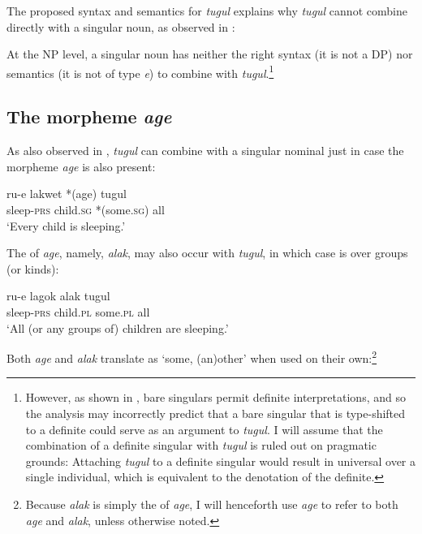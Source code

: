 \documentclass[output=paper]{LSP/langsci}
\begin{document}
The proposed syntax and semantics for \textit{tugul} explains why \textit{tugul} cannot combine directly with a singular noun, as observed in :

\z

\noindent At the NP level, a singular noun has neither the right syntax (it is not a DP) nor semantics (it is not of type \textit{e}) to combine with \textit{tugul}.\footnote{However, as shown in , bare singulars permit definite interpretations, and so the analysis may incorrectly predict that a bare singular that is type-shifted to a definite could serve as an argument to \textit{tugul}. I will assume that the combination of a definite singular with \textit{tugul} is ruled out on pragmatic grounds: Attaching \textit{tugul} to a definite singular would result in universal  over a single individual, which is equivalent to the denotation of the definite.}   

\subsection{The morpheme \textit{age}}
As also observed in , \textit{tugul} can combine with a singular nominal just in case the morpheme \textit{age} is also present:

\ea \label{ex:landman:agetugul}
\gll ru-e lakwet *(age) tugul\\
       sleep-\textsc{prs} child.\textsc{sg} *(some.\textsc{sg}) all\\
  \glt ‘Every child is sleeping.’
\z

\noindent The  of \textit{age}, namely, \textit{alak}, may also occur with \textit{tugul}, in which case  is over groups (or kinds):

\ea \label{ex:landman:alaktugul}
\gll ru-e lagok alak tugul\\
       sleep-\textsc{prs} child.\textsc{pl} some.\textsc{pl} all\\
  \glt ‘All (or any groups of) children are sleeping.’
\z
 
\noindent Both \textit{age} and \textit{alak} translate as ‘some, (an)other’ when used on their own:\footnote{Because \textit{alak} is simply the  of \textit{age}, I will henceforth use \textit{age} to refer to both \textit{age} and \textit{alak}, unless otherwise noted.}
\end{document}
